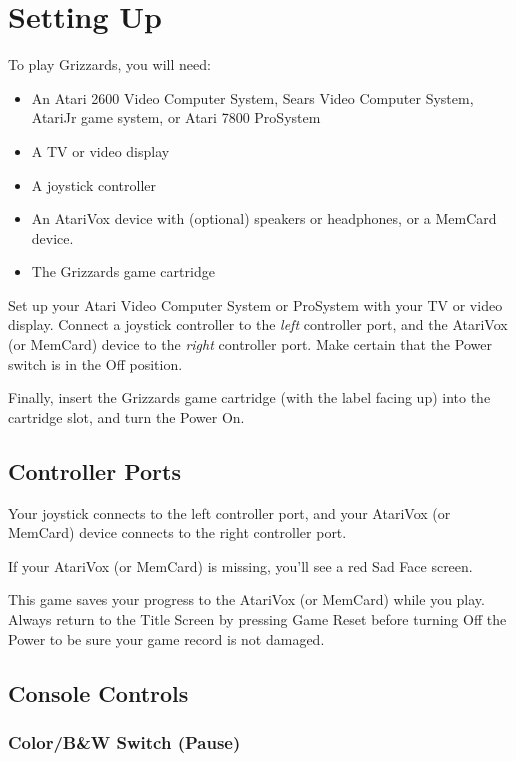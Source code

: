 \documentclass[12pt,twoside]{memoir}
\begin{document}
\chapter{Setting Up}\label{Setting Up}

To play Grizzards, you will need:

\begin{itemize}
\item An Atari 2600 Video  Computer System, Sears Video Computer System,
  AtariJr game system, or Atari 7800 ProSystem
\item A TV or video display
\item A joystick controller
\item  An AtariVox  device with  (optional) speakers  or headphones,  or
  a MemCard device.
\item The Grizzards game cartridge
\end{itemize}

Set up  your Atari Video  Computer System or  ProSystem with your  TV or
video  display.  Connect  a   joystick  controller  to  the  \emph{left}
controller  port,   and  the  AtariVox   (or  MemCard)  device   to  the
\emph{right} controller port.  Make certain that the Power  switch is in
the Off position.

Finally, insert the Grizzards game  cartridge (with the label facing up)
into the cartridge slot, and turn the Power On.

\section{Controller Ports}

Your joystick  connects to the  left controller port, and  your AtariVox
(or MemCard) device connects to the right controller port.

If  your  AtariVox  (or  MemCard)  is missing,  you'll  see  a  red  Sad
Face screen.

This game  saves your progress  to the  AtariVox (or MemCard)  while you
play. Always  return to the Title  Screen by pressing Game  Reset before
turning Off the Power to be sure your game record is not damaged.

\section{Console Controls}

\subsection{Color/B\&W Switch (Pause)}
\end{document}
